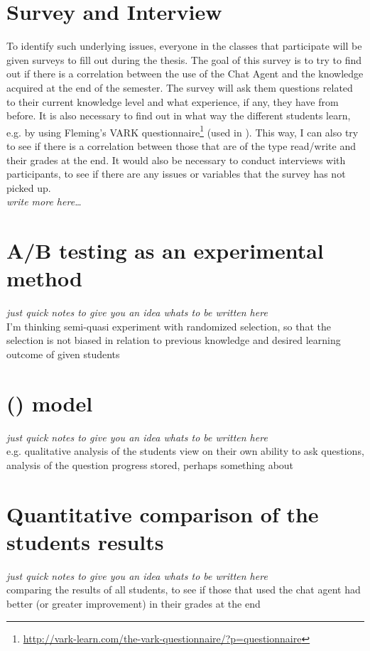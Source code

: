 \section{Survey and Interview}
\label{chapter4:survey_and_interview}
To identify such underlying issues, everyone in the classes that participate will be given surveys to fill out during the thesis. The goal of this survey is to try 
to find out if there is a correlation between the use of the Chat Agent and the knowledge acquired at the end of the semester. The survey will ask them questions 
related to their current knowledge level and what experience, if any, they have from before. It is also necessary to find out in what way the different students learn, 
e.g. by using Fleming's VARK questionnaire\footnote{\url{http://vark-learn.com/the-vark-questionnaire/?p=questionnaire}} (used in \cite[p.~152]{Kowalski2013}). This way, 
I can also try to see if there is a correlation between those that are of the type read/write and their grades at the end.
\vspace{0.5em}\newline
It would also be necessary to conduct interviews with participants, to see if there are any issues or variables that the survey has not picked up. \\
\emph{write more here\ldots}

\section{A/B testing as an experimental method}
\label{chapter4:ab_testing_experimental}
\emph{just quick notes to give you an idea whats to be written here} \\
I'm thinking semi-quasi experiment with randomized selection, so that the selection is not biased in relation to previous knowledge and desired learning outcome of 
given students

\section{ () model}
\label{chapter4:qa_model}
\emph{just quick notes to give you an idea whats to be written here} \\
e.g. qualitative analysis of the students view on their own ability to ask questions, analysis of the question progress stored, perhaps something about 

\section{Quantitative comparison of the students results}
\label{chapter4:quantitative_comparison}
\emph{just quick notes to give you an idea whats to be written here} \\
comparing the results of all students, to see if those that used the chat agent had better (or greater improvement) in their grades at the end

